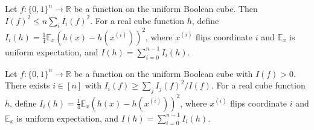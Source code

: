 \begin{lemma}
\leanok
{}
\label{KKL.cauchy_schwarz_influences}
Let $f:\{0,1\}^n\to\mathbb R$ be a function on the uniform Boolean cube. Then $I(f)^2\le
n\sum_iI_i(f)^2$. For a real cube function $h$, define $I_i(h)=\tfrac14\mathbb
E_x(h(x)-h(x^{(i)}))^2$, where $x^{(i)}$ flips coordinate $i$ and $\mathbb E_x$ is
uniform expectation, and $I(h)=\sum_{i=0}^{n-1}I_i(h)$.
\end{lemma}

\begin{lemma}
\leanok
{}
\label{KKL.max_influence_from_sum_sq}
Let $f:\{0,1\}^n\to\mathbb R$ be a function on the uniform Boolean cube with $I(f)>0$.
There exists $i\in[n]$ with $I_i(f)\ge\sum_jI_j(f)^2/I(f)$. For a real cube function
$h$, define $I_i(h)=\tfrac14\mathbb E_x(h(x)-h(x^{(i)}))^2$, where $x^{(i)}$ flips
coordinate $i$ and $\mathbb E_x$ is uniform expectation, and
$I(h)=\sum_{i=0}^{n-1}I_i(h)$.
\end{lemma}

